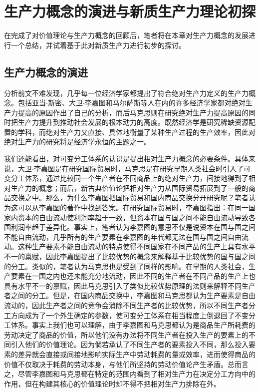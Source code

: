 
\chapter{生产力概念的演进与新质生产力理论初探}

在完成了对价值理论与生产力概念的回顾后，笔者将在本章对生产力概念的发展进行一个总结，并试着基于此对新质生产力进行初步的探讨。

\section{生产力概念的演进}

分析前文不难发现，几乎每一位经济学家都提出了符合绝对生产力定义的生产力概念。包括亚当$\cdot$斯密、大卫$\cdot$李嘉图和马尔萨斯等人在内的许多经济学家都对绝对生产力提高的原因作出了自己的分析，而后马克思则在研究绝对生产力提高原因的同时把生产力提升到推动社会发展的根本动力的高度\cite[148-149]{LiZhengFaZhanXinZhiShengChanLiDeLiLunLiShiHeXianShiSanChongLuoJi2023}\cite[520]{ZhongGongZhongYangMaKeSiEnGeSiLieNingSiDaLinZhuZuoBianYiJuMaKeSiEnGeSiWenJiDi1Juan2009}\cite[33-34]{ZhongGongZhongYangMaKeSiEnGeSiLieNingSiDaLinZhuZuoBianYiJuMaKeSiEnGeSiQuanJiDi3Juan1960}。既然经济学是研究稀缺资源配置的学科，而绝对生产力又直接、具体地衡量了某种生产过程的生产效率，因此对绝对生产力的研究将是经济学永恒的主题之一。

我们还能看出，对可变分工体系的认识是提出相对生产力概念的必要条件。具体来说，大卫$\cdot$李嘉图是在研究国际贸易时，马克思是在研究早期人类社会时引入了可变分工体系，通过比较同一个生产者在不同商品上的绝对生产力，间接地得到了相对生产力的概念；而后，新古典价值论把相对生产力从国际贸易拓展到了一般的商品交换之中。那么，为什么李嘉图把国际贸易和国内商品交换分开研究呢？笔者认为这可以从李嘉图的著作中找到答案。在研究国际贸易时，李嘉图指出：在同一国家内资本的自由流动使利润率趋于一致，但资本在国与国之间不能自由流动导致各国利润率趋于差异化\cite[111,113]{DaWei*LiJiaTuZhengZhiJingJiXueJiFuShuiYuanLi2021}。事实上，笔者认为李嘉图的意思不仅是说资本在国与国之间不能自由流动，几乎所有的生产要素在李嘉图的年代都无法在国与国之间自由流动。这种生产要素不能自由流动的特点使得不同国家在不同产品的生产上具有水平不一的禀赋，因此李嘉图提出了比较优势的概念来解释基于比较优势的国与国之间的分工。类似的，笔者认为马克思也是受到了同样的影响。在早期的人类社会，生产要素在一国之内也还未能充分地流动，因此不同的生产者在不同产品的生产上也具有水平不一的禀赋，因此马克思引入了类似比较优势原理的法则来解释不同生产者之间的分工。但是，在国内商品交换中，李嘉图和马克思都认为生产要素是自由流动的，因此生产者之间的竞争会消除不同生产者的比较优势，所以不同生产者分工方向成为了一个外生确定的参数，使可变分工体系在相当程度上倒退回了不变分工体系。事实上我们也可以理解，由于李嘉图和马克思都认为是商品生产所耗费的劳动决定了商品的价值，所以他们没有办法将不同生产者在投入生产的要素上的不同引入他们的价值理论。因为倘若承认了不同生产者的要素投入不同，那么投入要素的差异就会直接或间接地影响实际生产中劳动耗费的量或效率，进而使得商品的价值不仅取决于耗费的劳动本身，与他们所坚持的劳动价值论产生矛盾。总而言之，尽管李嘉图和马克思都在特定的范围内看到了相对生产力在决定分工方向中的作用，但在构建其核心的价值理论时却不得不把相对生产力排除在外。


